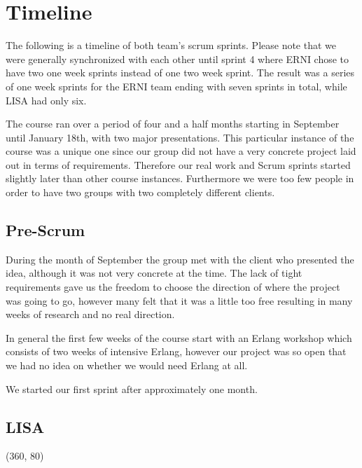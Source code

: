 \section {Timeline}

The following is a timeline of both team's scrum sprints. Please note that we were generally synchronized with each other until sprint 4 where ERNI chose to have two one week sprints instead of one two week sprint. The result was a series of one week sprints for the ERNI team ending with seven sprints in total, while LISA had only six.

The course ran over a period of four and a half months starting in September until January 18th, with two major presentations. This particular instance of the course was a unique one since our group did not have a very concrete project laid out in terms of requirements. Therefore our real work and Scrum sprints started slightly later than other course instances. Furthermore we were too few people in order to have two groups
with two completely different clients.

\subsection{Pre-Scrum}
During the month of September the group met with the client who presented the idea, although it was not very concrete at the time. The lack of tight requirements gave us the freedom to choose the direction of where the project was going to go, however many felt that it was a little too free resulting in many weeks of research and no real direction. 

In general the first few weeks of the course start with an Erlang workshop which consists of two weeks of intensive Erlang, however our project was so open that we had no idea on whether we would need Erlang at all.

We started our first sprint after approximately one month.

\subsection {LISA}
\begin{centering}
\framebox(360, 80){
}
\end{centering}

